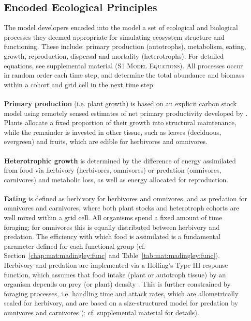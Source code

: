 \subsection{Encoded Ecological Principles}
\label{chap:mat:madingley:princip}
The model developers encoded into the model a set of ecological and biological processes they deemed appropriate for simulating ecosystem structure and functioning. These include: primary production (autotrophs), metabolism, eating, growth, reproduction, dispersal and mortality (heterotrophs). For detailed equations, see supplemental material (S1 \textsc{Model Equations}). All processes occur in random order each time step, and determine the total abundance and biomass within a cohort and grid cell in the next time step. \\\\
\textbf{Primary production} (i.e. plant growth) is based on an explicit carbon stock model using remotely sensed estimates of net primary productivity developed by \cite{Smith2012}. 
Plants allocate a fixed proportion of their growth into structural maintenance, while the remainder is invested in other tissue, such as leaves (deciduous, evergreen) and fruits, which are edible for herbivores and omnivores. 
\\\\
\textbf{Heterotrophic growth} is determined by the difference of energy assimilated from food via herbivory (herbivores, omnivores) or predation (omnivores, carnivores) and metabolic loss, as well as energy allocated for reproduction.\\\\
\textbf{Eating} is defined as herbivory for herbivores and omnivores, and as predation for omnivores and carnivores, where both plant stocks and heterotroph cohorts are well mixed within a grid cell. All organisms spend a fixed amount of time foraging; for omnivores this is equally distributed between herbivory and predation. 
The efficiency with which food is assimilated is a fundamental parameter defined for each functional group (cf. Section~\ref{chap:mat:madingley:func} and Table~\ref{tab:mat:madingley:func}). \\
Herbivory and predation are implemented via a Holling's Type III response function, which assumes that food intake (plant or autotroph tissue) by an organism depends on prey (or plant) density \citep{Denno2012}. 
This is further constrained by foraging processes, i.e. handling time and attack rates, which are allometrically scaled for herbivory, and are based on a size-structured model for predation by omnivores and carnivores (\citet{Williams2011}; cf. supplemental material for details). 
